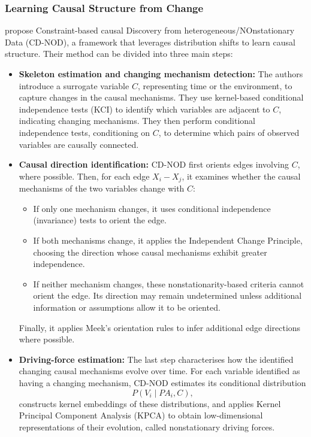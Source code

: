 \subsubsection{Learning Causal Structure from Change}
\label{subsec:lr-learning-causal-structure}
\citet{huang2020causal} propose Constraint-based causal Discovery from heterogeneous/NOnstationary Data (CD-NOD), a
framework that leverages distribution shifts to learn causal structure. Their method can be divided into three main steps:
\begin{itemize}

    \item \textbf{Skeleton estimation and changing mechanism detection:}
    The authors introduce a surrogate variable $C$, representing time or the environment, to capture changes in the causal mechanisms. They use kernel-based conditional independence tests (KCI) to identify which variables are adjacent to $C$, indicating changing mechanisms. They then perform conditional independence tests, conditioning on $C$, to determine which pairs of observed variables are causally connected.

    \item \textbf{Causal direction identification:}
    CD-NOD first orients edges involving $C$, where possible. Then, for each edge $X_i-X_j$, it examines whether the causal mechanisms of the two variables change with $C$:
    \begin{itemize}
        \item If only one mechanism changes, it uses conditional independence (invariance) tests to orient the edge.
        \item If both mechanisms change, it applies the Independent Change Principle, choosing the direction whose causal mechanisms exhibit greater independence.
        \item If neither mechanism changes, these nonstationarity-based criteria cannot orient the edge. Its direction may remain undetermined unless additional information or assumptions allow it to be oriented.
    \end{itemize}
    Finally, it applies Meek's orientation rules to infer additional edge directions where possible.

    \item \textbf{Driving-force estimation:}
    The last step characterises how the identified changing causal mechanisms evolve over time. For each variable identified as having a changing mechanism, CD-NOD estimates its conditional distribution
    \[
        P(V_i \mid PA_i,C),
    \]
    constructs kernel embeddings of these distributions, and applies Kernel Principal Component Analysis (KPCA) to obtain low-dimensional representations of their evolution, called nonstationary driving forces.

\end{itemize}
